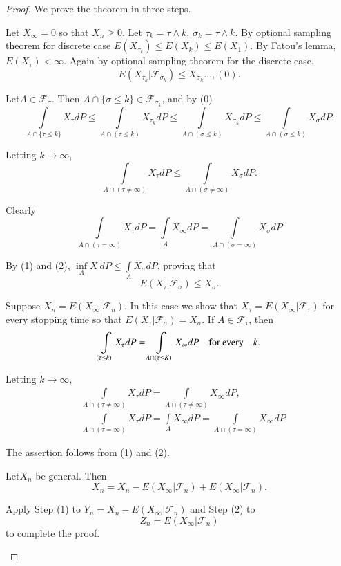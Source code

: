 \begin{proof}
We prove the theorem in three steps.

\setcounter{step}{0}
\begin{step}%
Let $X_{\infty}=0$ so that $X_{n}\geq 0$. Let $\tau_{k}=\tau\wedge k$,
$\sigma_{k}=\tau\wedge k$. By optional sampling theorem for discrete
case $E(X_{\tau_{k}})\leq E(X_{k})\leq E(X_{1})$. By Fatou's lemma,
$E(X_{\tau})<\infty$. Again by optional sampling theorem for the
discrete case,
$$
E(X_{\tau_{k}}|\mathscr{F}_{\sigma_{k}})\leq X_{\sigma_{k}}\ldots,(0).
$$

Let\pageoriginale $A\in \mathscr{F}_{\sigma}$. Then $A\cap
\{\sigma\leq k\}\in \mathscr{F}_{\sigma_{k}}$, and by (0)
$$
 \int\limits_{A\cap\{\tau\leq k\}}X_{\tau}dP\leq \int\limits_{A\cap
  (\tau\leq k)}X_{\tau_{k}}dP\leq \int\limits_{A\cap (\sigma\leq
  k)}X_{\sigma_{k}}dP\leq \int\limits_{A\cap (\sigma\leq
  k)}X_{\sigma}dP. 
$$

Letting $k\to \infty$,
\begin{equation*}
\int\limits_{A\cap (\tau \neq \infty)}X_{\tau}dP\leq
\int\limits_{A\cap (\sigma\neq \infty)}X_{\sigma}dP.\tag{1}
\end{equation*}

Clearly
\begin{equation*}
\int\limits_{A\cap
  (\tau=\infty)}X_{\tau}dP=\int\limits_{A}X_{\infty}dP=\int\limits_{A\cap
  (\sigma=\infty)}X_{\sigma}dP\tag{2} 
\end{equation*}

By (1) and (2), $\inf\limits_{A}X\ dP\leq\int\limits_{A}X_{\sigma}dP$,
proving that
$$
E(X_{\tau}|\mathscr{F}_{\sigma})\leq X_{\sigma}.
$$
\end{step}

\begin{step}%
Suppose $X_{n}=E(X_{\infty}|\mathscr{F}_{n})$. In this case we show
that $X_{\tau}=E(X_{\infty}|\mathscr{F}_{\tau})$ for every stopping
time so that $E(X_{\tau}|\mathscr{F}_{\sigma})=X_{\sigma}$. If $A\in
\mathscr{F}_{\tau}$, then
$$
\int\limits_{(\tau\leq k)}X_{\tau}dP=\int\limits_{A\cap (\tau \leq
  K)}X_{\infty}dP\quad\text{for every}\quad k.
$$

Letting $k\to \infty$,
\begin{align*}
& \int\limits_{A\cap (\tau \neq \infty)}X_{\tau}dP=\int\limits_{A\cap
    (\tau\neq \infty)}X_{\infty}dP,\tag{1}\\
& \int\limits_{A\cap
    (\tau=\infty)}X_{\tau}dP=\int\limits_{A}X_{\infty}dP=\int\limits_{A\cap
    (\tau=\infty)}X_{\infty}dP\tag{2} 
\end{align*}

The assertion follows from (1) and (2).
\end{step}

\begin{step}%
Let\pageoriginale $X_{n}$ be general. Then
$$
X_{n}=X_{n}-E(X_{\infty}|\mathscr{F}_{n})+E(X_{\infty}|\mathscr{F}_{n}).
$$

Apply Step (1) to $Y_{n}=X_{n}-E(X_{\infty}|\mathscr{F}_{n})$ and Step
(2) to 
$$
Z_{n}=E(X_{\infty}|\mathscr{F}_{n})
$$ 
to complete the proof.
\end{step}
\end{proof}

